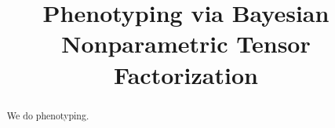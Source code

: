 \documentclass[conference]{IEEEtran}
\begin{document}
%
\title{Phenotyping via Bayesian Nonparametric Tensor Factorization}









\maketitle


\begin{abstract}
We do phenotyping. 

\end{abstract}


%
\IEEEpeerreviewmaketitle
\end{document}
